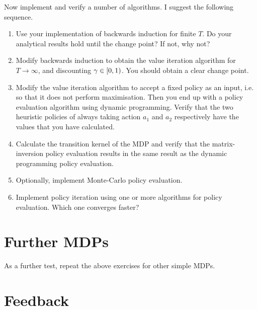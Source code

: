 \documentclass[twoside,a4paper]{article}
\begin{document}
\begin{exercise}[60-120]
  Now implement and verify a number of algorithms. I suggest the following sequence.
  \begin{enumerate}
  \item Use your implementation of backwards induction for finite $T$. Do your analytical results hold until the change point? If not, why not?
  \item Modify backwards induction to obtain the value iteration algorithm for $T \to \infty$, and discounting $\gamma \in [0, 1)$. You should obtain a clear change point.
  \item Modify the value iteration algorithm to accept a fixed policy as an input, i.e. so that it does not perform maximisation. Then you end up with a policy evaluation algorithm using dynamic programming. Verify that the two heuristic policies of always taking action $a_1$ and $a_2$ respectively have the values that you have calculated.
  \item Calculate the transition kernel of the MDP and verify that the matrix-inversion policy evaluation results in the same result as the dynamic programming policy evaluation.
  \item Optionally, implement Monte-Carlo policy evaluation.
  \item Implement policy iteration using one or more algorithms for policy evaluation. Which one converges faster?
  \end{enumerate}
  \label{exercise:simple-mdp-implementation}
\end{exercise}

\section{Further MDPs}

As a further test, repeat the above exercises for other simple MDPs.

\section{Feedback}
\end{document}
